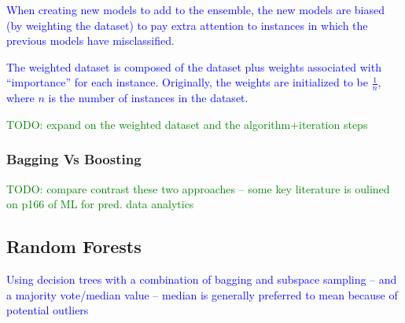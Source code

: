 \textcolor{blue}{When creating new models to add to the ensemble, the new models are biased (by weighting the dataset) to pay extra attention to instances in which the previous models have misclassified.}

\textcolor{blue}{The weighted dataset is composed of the dataset plus weights associated with ``importance'' for each instance. Originally, the weights are initialized to be $\frac{1}{n}$, where $n$ is the number of instances in the dataset.}

\textcolor{green}{TODO: expand on the weighted dataset and the algorithm+iteration steps}

\subsubsection{Bagging Vs Boosting}

\textcolor{green}{TODO: compare contrast these two approaches -- some key literature is oulined on p166 of ML for pred. data analytics}

\subsection{Random Forests}

\textcolor{blue}{Using decision trees with a combination of bagging and subspace sampling -- and a majority vote/median value -- median is generally preferred to mean because of potential outliers}
